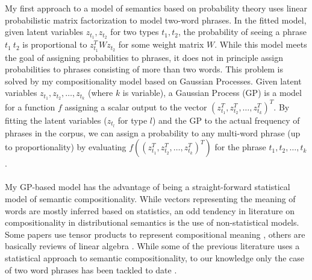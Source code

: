 \documentclass[11pt]{article}
\begin{document}
My first approach to a model of semantics based on probability theory uses linear probabilistic matrix factorization to model two-word phrases. In the fitted model, given latent variables $z_{t_1}, z_{t_2}$ for two types $t_1, t_2$, the probability of seeing a phrase $t_1~t_2$ is proportional to $z_{t_1}^T W z_{t_2}$ for some weight matrix $W$. While this model meets the goal of assigning probabilities to phrases, it does not in principle assign probabilities to phrases consisting of more than two words. This problem is solved by my compositionality model based on Gaussian Processes. Given latent variables $z_{t_1}, z_{t_2}, \dots, z_{t_k}$ (where $k$ is variable), a Gaussian Process (GP) is a model for a function $f$ assigning a scalar output to the vector $(z^T_{t_1}, z^T_{t_2}, \dots, z^T_{t_k})^T$. By fitting the latent variables ($z_{t_l}$ for type $l$) and the GP to the actual frequency of phrases in the corpus, we can assign a probability to any multi-word phrase (up to proportionality) by evaluating $f((z^T_{t_1}, z^T_{t_2}, \dots, z^T_{t_k})^T)$ for the phrase $t_1, t_2, \dots, t_k$.\\
\\
My GP-based model has the advantage of being a straight-forward statistical model of semantic compositionality. While vectors representing the meaning of words are mostly inferred based on statistics, an odd tendency in literature on compositionality in distributional semantics is the use of non-statistical models. Some papers use tensor products to represent compositional meaning \cite{Widdows2008, Clark2007, Clark2008}, others are basically reviews of linear algebra \cite{Clarke2011}. While some of the previous literature uses a statistical approach to semantic compositionality, to our knowledge only the case of two word phrases has been tackled to date \cite{Guevara2010,Baroni2010a}.
\end{document}
